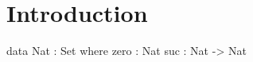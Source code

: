 \chapter{Introduction}

\begin{code}
data Nat : Set where
  zero  :  Nat
  suc   :  Nat -> Nat
\end{code}
